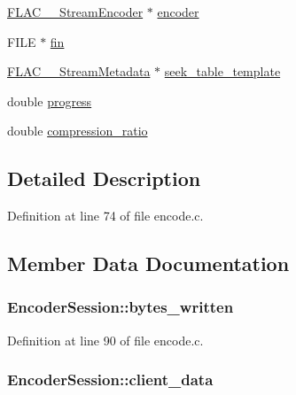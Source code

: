 \begin{DoxyCompactItemize}
\begin{tabbing}
\end{tabbing}\item 
\hyperlink{struct_f_l_a_c_____stream_encoder}{F\+L\+A\+C\+\_\+\+\_\+\+Stream\+Encoder} $\ast$ \hyperlink{struct_encoder_session_ae0641c6b6a48bad0d16034653c303b35}{encoder}
\item 
F\+I\+LE $\ast$ \hyperlink{struct_encoder_session_a853ba8fffd7e57f10d7f6b4fde7bfd1a}{fin}
\item 
\hyperlink{struct_f_l_a_c_____stream_metadata}{F\+L\+A\+C\+\_\+\+\_\+\+Stream\+Metadata} $\ast$ \hyperlink{struct_encoder_session_af7a7cdd54c9d40e45e5672f66847222e}{seek\+\_\+table\+\_\+template}
\item 
double \hyperlink{struct_encoder_session_a3d10732b638e531c3aae439b5309c9f6}{progress}
\item 
double \hyperlink{struct_encoder_session_a3925c96b3ca8629ec49a2ed149054ca7}{compression\+\_\+ratio}
\end{DoxyCompactItemize}


\subsection{Detailed Description}


Definition at line 74 of file encode.\+c.



\subsection{Member Data Documentation}
\subsubsection[{\texorpdfstring{bytes\+\_\+written}{bytes_written}}]{ Encoder\+Session\+::bytes\+\_\+written}\hypertarget{struct_encoder_session_acd26b35cee2e09041e515cb4ae3644bd}{}\label{struct_encoder_session_acd26b35cee2e09041e515cb4ae3644bd}


Definition at line 90 of file encode.\+c.

\subsubsection[{\texorpdfstring{client\+\_\+data}{client_data}}]{ Encoder\+Session\+::client\+\_\+data}\hypertarget{struct_encoder_session_abee1215e2c0dc19229ccc269c926957b}{}\label{struct_encoder_session_abee1215e2c0dc19229ccc269c926957b}


